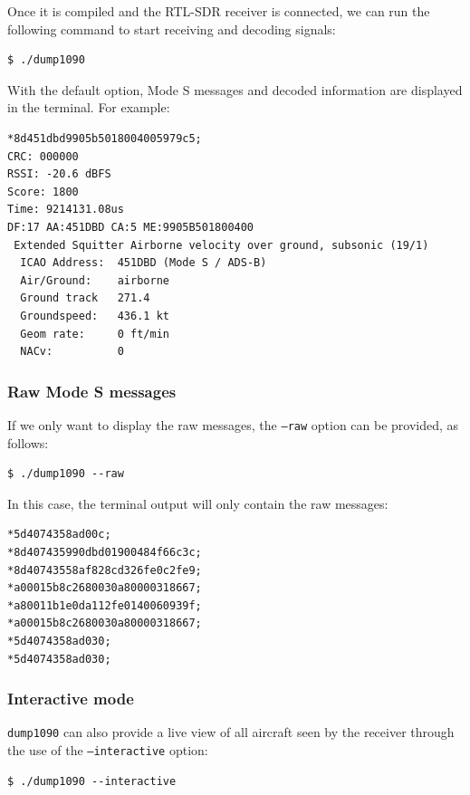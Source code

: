 Once it is compiled and the RTL-SDR receiver is connected, we can run the following command to start receiving and decoding signals:

\begin{verbatim}
$ ./dump1090
\end{verbatim}

With the default option, Mode S messages and decoded information are displayed in the terminal. For example:

\begin{verbatim}
*8d451dbd9905b5018004005979c5;
CRC: 000000
RSSI: -20.6 dBFS
Score: 1800
Time: 9214131.08us
DF:17 AA:451DBD CA:5 ME:9905B501800400
 Extended Squitter Airborne velocity over ground, subsonic (19/1)
  ICAO Address:  451DBD (Mode S / ADS-B)
  Air/Ground:    airborne
  Ground track   271.4
  Groundspeed:   436.1 kt
  Geom rate:     0 ft/min
  NACv:          0
\end{verbatim}

\subsubsection{Raw Mode S messages}

If we only want to display the  raw messages, the \texttt{--raw} option can be provided, as follows:

\begin{verbatim}
$ ./dump1090 --raw
\end{verbatim}

In this case, the terminal output will only contain the raw messages:

\begin{verbatim}
*5d4074358ad00c;
*8d407435990dbd01900484f66c3c;
*8d40743558af828cd326fe0c2fe9;
*a00015b8c2680030a80000318667;
*a80011b1e0da112fe0140060939f;
*a00015b8c2680030a80000318667;
*5d4074358ad030;
*5d4074358ad030;
\end{verbatim}

\subsubsection{Interactive mode}

\texttt{dump1090} can also provide a live view of all aircraft seen by the receiver through the use of the \texttt{--interactive} option:

\begin{verbatim}
$ ./dump1090 --interactive
\end{verbatim}

